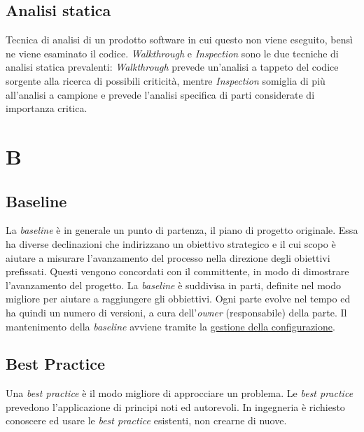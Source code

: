	\subsection{Analisi statica}
	\label{sec:analisistatica}
	Tecnica di analisi di un prodotto software in cui questo non viene eseguito, bensì ne viene esaminato il codice.
	\emph{Walkthrough} e \emph{Inspection} sono le due tecniche di analisi statica prevalenti: \emph{Walkthrough} prevede un'analisi a tappeto del codice sorgente alla ricerca di possibili criticità, mentre \emph{Inspection} somiglia di più all'analisi a campione e prevede l'analisi specifica di parti considerate di importanza critica.
	\newpage
	\section{B}
	\subsection{Baseline}
	\label{sec:baseline}
	La \emph{baseline} è in generale un punto di partenza, il piano di progetto originale. Essa ha diverse declinazioni che indirizzano un obiettivo strategico e il cui scopo è aiutare a misurare l'avanzamento del processo nella direzione degli obiettivi prefissati. Questi vengono concordati con il committente, in modo di dimostrare l'avanzamento del progetto. La  \emph{baseline} è suddivisa in parti, definite nel modo migliore per aiutare a raggiungere gli obbiettivi. Ogni parte evolve nel tempo ed ha quindi un numero di versioni, a cura dell'\emph{owner} (responsabile) della parte. Il mantenimento della  \emph{baseline} avviene tramite la \hyperref[sec:controlloconfigurazione]{gestione della configurazione}. 
	
	\subsection{Best Practice}
	\label{sec:bestpractice}
	Una \emph{best practice} è il modo migliore di approcciare un problema. Le \emph{best practice} prevedono l'applicazione di principi noti ed autorevoli. In ingegneria è richiesto conoscere ed usare le \emph{best practice} esistenti, non crearne di nuove.

